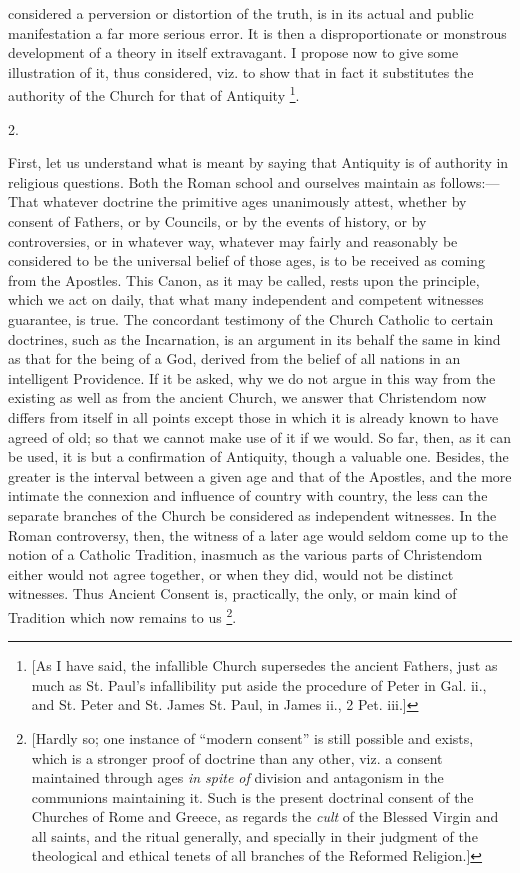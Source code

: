 considered a perversion or distortion of the truth, is in its actual
and public manifestation a far more serious error. It is then a
disproportionate or monstrous development of a theory in itself
extravagant. I propose now to give some illustration of it, thus
considered, viz. to show that in fact it substitutes the authority of
the Church for that of Antiquity \footnote{[As I have said, the infallible Church
supersedes the ancient Fathers, just as much as St. Paul's
infallibility put aside the procedure of Peter in Gal. ii., and St.
Peter and St. James St. Paul, in James ii., 2 Pet. iii.]}.

2.

First, let us understand what is meant by saying that Antiquity is
of authority in religious questions. Both the Roman school and
ourselves maintain as follows:—That whatever doctrine the
primitive ages unanimously attest, whether by consent of Fathers, or
by Councils, or by the events of history, or by controversies, or in
whatever way, whatever may fairly and reasonably be considered to be
the universal belief of those ages, is to be received as coming from
the Apostles. This Canon, as it may be called, rests upon the
principle, which we act on daily, that what many independent and
competent witnesses guarantee, is true. The concordant testimony of
the Church Catholic to certain doctrines, such as the Incarnation, is
an argument in its behalf the same in kind as that for the being of a
God, derived from the belief of all nations in an intelligent
Providence. If it be asked, why we do not argue in this way from the
existing as well as from the ancient Church, we answer that
Christendom now differs from itself in all points except those in
which it is already known to have agreed of old; so that we cannot
make use of it if we would. So far, then, as it can be used, it is but
a confirmation of Antiquity, though a valuable one. Besides, the
greater is the interval between a given age and that of the Apostles,
and the more intimate the connexion and influence of country with
country, the less can the separate branches of the Church be
considered as independent witnesses. In the Roman controversy, then,
the witness of a later age would seldom come up to the notion of a
Catholic Tradition, inasmuch as the various parts of Christendom
either would not agree together, or when they did, would not be
distinct witnesses. Thus Ancient Consent is, practically, the only, or
main kind of Tradition which now remains to us \footnote{[Hardly so; one instance of ``modern
consent'' is still possible and exists, which is a stronger proof
of doctrine than any other, viz. a consent maintained through ages \emph{in
spite of} division and antagonism in the communions maintaining it.
Such is the present doctrinal consent of the Churches of Rome and
Greece, as regards the \emph{cult} of the Blessed Virgin and all
saints, and the ritual generally, and specially in their judgment of
the theological and ethical tenets of all branches of the Reformed
Religion.]}.

